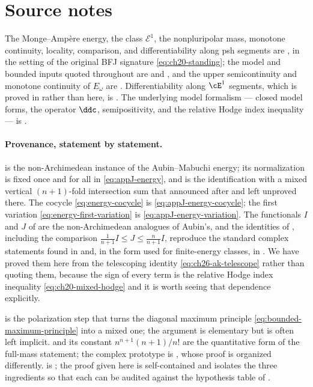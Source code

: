 \section*{Source notes}

The Monge--Amp\`ere energy, the class \(\mathcal E^1\), the nonpluripolar
mass, monotone continuity, locality, comparison, and differentiability along
psh segments are \cite[\S6]{BFJ15}, in the setting of the original BFJ
signature \eqref{eq:ch20-standing}; the model and bounded inputs quoted
throughout are \cite[Theorem~3.1]{BFJ15} and
\cite[Theorem~5.1 and Corollaries~5.2--5.3]{BFJ15}, and the upper
semicontinuity and monotone continuity of \(E_\omega\) are
\cite[Proposition~6.2]{BFJ15}.  Differentiability along \(\cE^1\) segments,
which is proved in  rather than here, is
\cite[Proposition~6.12]{BFJ15}.  The underlying model formalism --- closed
model forms, the operator \(\ddc\), semipositivity, and the relative Hodge
index inequality --- is \cite[\S\S2 and 4--5]{BFJ16}.

\paragraph{Provenance, statement by statement.}
 is the non-Archimedean instance of the
Aubin--Mabuchi energy; its normalization is fixed once and for all in
\eqref{eq:appJ-energy}, and  is the
identification with a mixed vertical \((n+1)\)-fold intersection sum that
 announced after
 and left unproved there.  The cocycle
\eqref{eq:energy-cocycle} is \eqref{eq:appJ-energy-cocycle}; the first
variation \eqref{eq:energy-first-variation} is
\eqref{eq:appJ-energy-variation}.  The functionals \(I\) and \(J\) of
 are the non-Archimedean analogues of Aubin's, and the
identities of , including the
comparison \(\frac1{n+1}I\leq J\leq\frac n{n+1}I\), reproduce the standard
complex statements found in \cite[\S2]{BEGZ10} and, in the form used for
finite-energy classes, in \cite{GZ07}.  We have proved them here from the
telescoping identity \eqref{eq:ch26-ak-telescope} rather than quoting them,
because the sign of every term is the relative Hodge index inequality
\eqref{eq:ch20-mixed-hodge} and it is worth seeing that dependence
explicitly.

 is the polarization step that turns the
diagonal maximum principle \eqref{eq:bounded-maximum-principle} into a mixed
one; the argument is elementary but is often left implicit.
 and its constant \(n^{n+1}(n+1)/n!\) are the
quantitative form of the full-mass statement; the complex prototype is
\cite[Proposition~1.6]{BEGZ10}, whose proof is organized differently.
 is \cite[\S6]{BFJ15}; the proof given here is
self-contained and isolates the three ingredients so that each can be
audited against the hypothesis table of .


